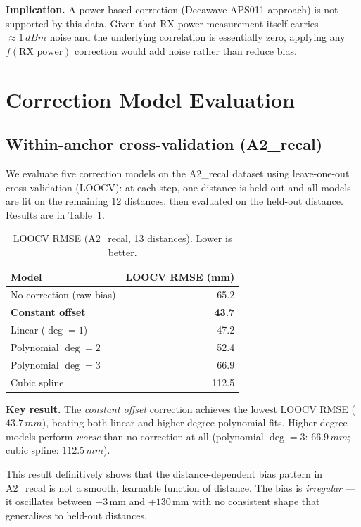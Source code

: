 \documentclass[10pt,a4paper,twocolumn]{article}
\begin{document}
\textbf{Implication.}  A power-based correction (Decawave APS011 approach)
is not supported by this data.  Given that RX power measurement itself carries
$\approx 1\,dBm$ noise and the underlying correlation is essentially
zero, applying any $f(\text{RX power})$ correction would add noise rather than
reduce bias.

\section{Correction Model Evaluation}
\label{sec:correction}

\subsection{Within-anchor cross-validation (A2\_recal)}

We evaluate five correction models on the A2\_recal dataset using
leave-one-out cross-validation (LOOCV): at each step, one distance is held out
and all models are fit on the remaining 12 distances, then evaluated on the
held-out distance.  Results are in Table~\ref{tab:loocv}.

\begin{table}[H]
\centering
\caption{LOOCV RMSE (A2\_recal, 13 distances). Lower is better.}
\label{tab:loocv}
\begin{tabular}{lr}
\toprule
Model & LOOCV RMSE (mm) \\
\midrule
No correction (raw bias) & 65.2 \\
\textbf{Constant offset}         & \textbf{43.7} \\
Linear ($\deg = 1$)     & 47.2 \\
Polynomial $\deg = 2$   & 52.4 \\
Polynomial $\deg = 3$   & 66.9 \\
Cubic spline             & 112.5 \\
\bottomrule
\end{tabular}
\end{table}

\textbf{Key result.}  The \emph{constant offset} correction achieves the lowest
LOOCV RMSE ($43.7\,mm$), beating both linear and higher-degree
polynomial fits.  Higher-degree models perform \emph{worse} than no correction
at all (polynomial $\deg = 3$: $66.9\,mm$; cubic spline:
$112.5\,mm$).

This result definitively shows that the distance-dependent bias pattern in
A2\_recal is not a smooth, learnable function of distance.  The bias is
\emph{irregular} --- it oscillates between $+3$\,mm and $+130$\,mm with no
consistent shape that generalises to held-out distances.
\end{document}
